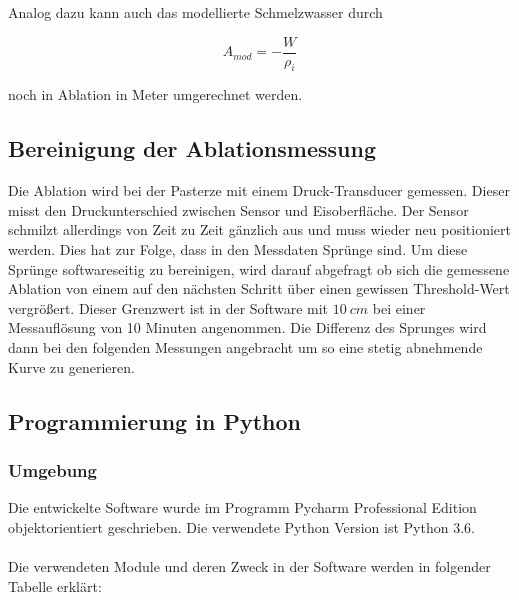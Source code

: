 \documentclass[12pt,a4paper]{article}
\begin{document}
Analog dazu kann auch das modellierte Schmelzwasser durch

\begin{equation}
A_{mod} = -\frac{W}{\rho_{i}}
\end{equation}

noch in Ablation in Meter umgerechnet werden.

\subsection{Bereinigung der Ablationsmessung}
Die Ablation wird bei der Pasterze mit einem Druck-Transducer gemessen. Dieser misst den Druckunterschied zwischen Sensor und Eisoberfläche. Der Sensor schmilzt allerdings von Zeit zu Zeit gänzlich aus und muss wieder neu positioniert werden. Dies hat zur Folge, dass in den Messdaten Sprünge sind. Um diese Sprünge softwareseitig zu bereinigen, wird darauf abgefragt ob sich die gemessene Ablation von einem auf den nächsten Schritt über einen gewissen Threshold-Wert vergrößert. Dieser Grenzwert ist in der Software mit $10~cm$ bei einer Messauflösung von 10 Minuten angenommen. Die Differenz des Sprunges wird dann bei den folgenden Messungen angebracht um so eine stetig abnehmende Kurve zu generieren.



\subsection{Programmierung in Python}
\subsubsection{Umgebung}

Die entwickelte Software wurde im Programm Pycharm Professional Edition objektorientiert geschrieben. Die verwendete Python Version ist Python 3.6.\\\\
Die verwendeten Module und deren Zweck in der Software werden in folgender Tabelle erklärt:
\end{document}
